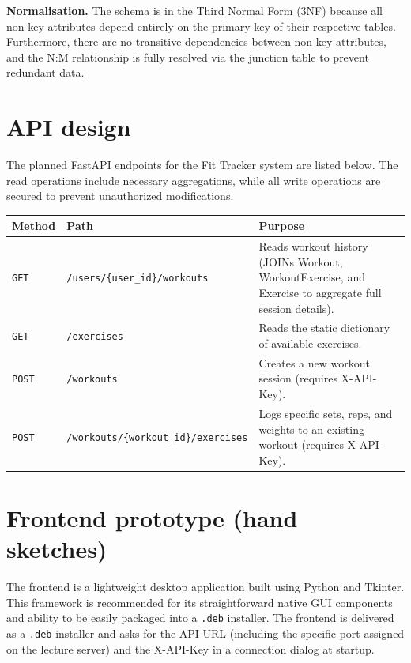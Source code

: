 \documentclass[11pt,a4paper]{article}
\begin{document}
\textbf{Normalisation.} The schema is in the Third Normal Form (3NF) because all non-key attributes depend entirely on the primary key of their respective tables. Furthermore, there are no transitive dependencies between non-key attributes, and the N:M relationship is fully resolved via the junction table to prevent redundant data.

\section{API design}

The planned FastAPI endpoints for the Fit Tracker system are listed below. The read operations include necessary aggregations, while all write operations are secured to prevent unauthorized modifications.

\renewcommand{\arraystretch}{1.5}
\begin{tabularx}{\linewidth}{@{}p{2cm}p{6cm}X@{}}
\toprule
\textbf{Method} & \textbf{Path} & \textbf{Purpose} \\
\midrule
\texttt{GET}  & \texttt{/users/\{user\_id\}/workouts} & Reads workout history (JOINs Workout, WorkoutExercise, and Exercise to aggregate full session details). \\
\texttt{GET}  & \texttt{/exercises} & Reads the static dictionary of available exercises. \\
\texttt{POST} & \texttt{/workouts} & Creates a new workout session (requires X-API-Key). \\
\texttt{POST} & \texttt{/workouts/\{workout\_id\}/exercises} & Logs specific sets, reps, and weights to an existing workout (requires X-API-Key). \\
\bottomrule
\end{tabularx}


\section{Frontend prototype (hand sketches)}

The frontend is a lightweight desktop application built using Python and Tkinter. This framework is recommended for its straightforward native GUI components and ability to be easily packaged into a \texttt{.deb} installer. The frontend is delivered as a \texttt{.deb} installer and asks for the API URL (including the specific port assigned on the lecture server) and the X-API-Key in a connection dialog at startup.
\end{document}
